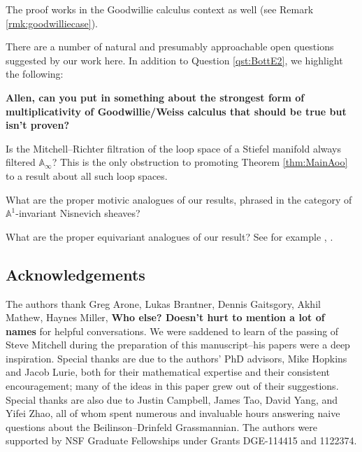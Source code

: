 The proof works in the Goodwillie calculus context as well (see Remark \ref{rmk:goodwilliecase}).

There are a number of natural and presumably approachable open questions suggested by our work here.  In addition to Question \ref{qst:BottE2}, we highlight the following:

\begin{qst}
\textbf{
Allen, can you put in something about the strongest form of multiplicativity of Goodwillie/Weiss calculus that should be true but isn't proven?
}
\end{qst}

\begin{qst}
Is the Mitchell--Richter filtration of the loop space of a Stiefel manifold always filtered $\mathbb{A}_\infty$?  This is the only obstruction to promoting Theorem \ref{thm:MainAoo} to a result about all such loop spaces.
\end{qst}

\begin{qst}
What are the proper motivic analogues of our results, phrased in the category of $\mathbb{A}^1$-invariant Nisnevich sheaves?
\end{qst}

\begin{qst}
What are the proper equivariant analogues of our result?  See for example \cite{Ullman}, \cite{Tynan}.
\end{qst}

\subsection*{Acknowledgements}
The authors thank Greg Arone, Lukas Brantner, Dennis Gaitsgory, Akhil Mathew, Haynes Miller, \textbf{Who else?  Doesn't hurt to mention a lot of names} for helpful conversations.  We were saddened to learn of the passing of Steve Mitchell during the preparation of this manuscript--his papers were a deep inspiration.  Special thanks are due to the authors' PhD advisors, Mike Hopkins and Jacob Lurie, both for their mathematical expertise and their consistent encouragement; many of the ideas in this paper grew out of their suggestions.  Special thanks are also due to Justin Campbell, James Tao, David Yang, and Yifei Zhao, all of whom spent numerous and invaluable hours answering naive questions about the Beilinson--Drinfeld Grassmannian.  The authors were supported by NSF Graduate Fellowships under Grants DGE-114415 and 1122374.

